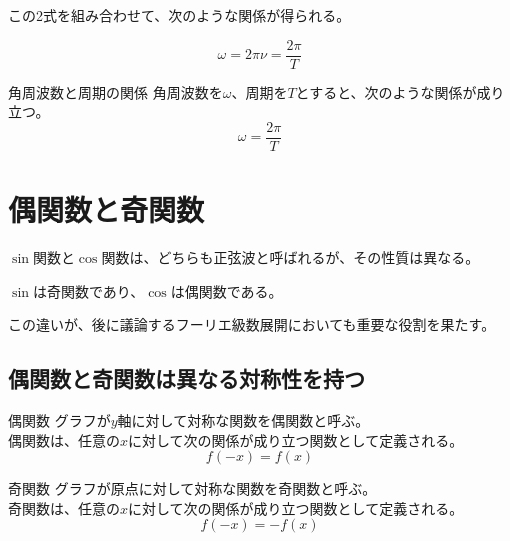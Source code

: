 \documentclass[../math-imaging]{subfiles}
\begin{document}
この2式を組み合わせて、次のような関係が得られる。

\begin{equation}
  \omega = 2\pi\nu = \dfrac{2\pi}{T}
\end{equation}

\begin{theorem}{角周波数と周期の関係}
  \newline
  角周波数を$\omega$、周期を$T$とすると、次のような関係が成り立つ。
  \LARGE
  \begin{equation}
    \omega = \dfrac{2\pi}{T}
  \end{equation}
\end{theorem}

\section{偶関数と奇関数}

$\sin$関数と$\cos$関数は、どちらも正弦波と呼ばれるが、その性質は異なる。

$\sin$は奇関数であり、$\cos$は偶関数である。

この違いが、後に議論するフーリエ級数展開においても重要な役割を果たす。

\subsection{偶関数と奇関数は異なる対称性を持つ}

\begin{definition}{偶関数}
  \newline
  グラフが$y$軸に対して対称な関数を偶関数と呼ぶ。\\
  偶関数は、任意の$x$に対して次の関係が成り立つ関数として定義される。
  \LARGE
  \begin{equation}
    f(-x) = f(x)
  \end{equation}
\end{definition}

\begin{definition}{奇関数}
  \newline
  グラフが原点に対して対称な関数を奇関数と呼ぶ。\\
  奇関数は、任意の$x$に対して次の関係が成り立つ関数として定義される。
  \LARGE
  \begin{equation}
    f(-x) = -f(x)
  \end{equation}
\end{definition}
\end{document}
